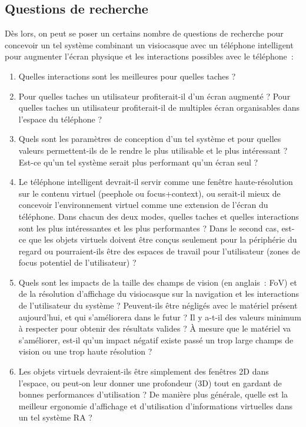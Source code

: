 \subsection*{Questions de recherche}
Dès lors, on peut se poser un certains nombre de questions de recherche pour concevoir un tel système combinant un visiocasque avec un téléphone intelligent pour augmenter l'écran physique et les interactions possibles avec le téléphone~:
\begin{enumerate}
	\item Quelles interactions sont les meilleures pour quelles taches ?
	\item Pour quelles taches un utilisateur profiterait-il d'un écran augmenté ? Pour quelles taches un utilisateur profiterait-il de multiples écran organisables dans l'espace du téléphone ?
	\item Quels sont les paramètres de conception d'un tel système et pour quelles valeurs permettent-ils de le rendre le plus utilisable et le plus intéressant ? Est-ce qu'un tel système serait plus performant qu'un écran seul ?
	\item Le téléphone intelligent devrait-il servir comme une fenêtre haute-résolution sur le contenu virtuel (peephole ou focus+context), ou serait-il mieux de concevoir l'environnement virtuel comme une extension de l'écran du téléphone. Dans chacun des deux modes, quelles taches et quelles interactions sont les plus intéressantes et les plus performantes ? Dans le second cas, est-ce que les objets virtuels doivent être conçus seulement pour la périphérie du regard ou pourraient-ils être des espaces de travail pour l'utilisateur (zones de focus potentiel de l'utilisateur) ?
	\item Quels sont les impacts de la taille des champs de vision (en anglais~: FoV) et de la résolution d'affichage du visiocasque sur la navigation et les interactions de l'utilisateur du système ? Peuvent-ils être négligés avec le matériel présent aujourd'hui, et qui s'améliorera dans le futur ? Il y a-t-il des valeurs minimum à respecter pour obtenir des résultats valides ? À mesure que le matériel va s'améliorer, est-il qu'un impact négatif existe passé un trop large champs de vision ou une trop haute résolution ?
	\item Les objets virtuels devraient-ils être simplement des fenêtres 2D dans l'espace, ou peut-on leur donner une profondeur (3D) tout en gardant de bonnes performances d'utilisation ? De manière plus générale, quelle est la meilleur ergonomie d'affichage et d'utilisation d'informations virtuelles dans un tel système RA ?
\end{enumerate}

